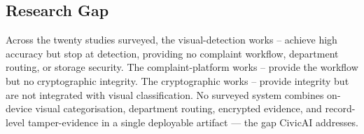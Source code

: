 \documentclass[conference]{IEEEtran}
\begin{document}
\subsection{Research Gap}
Across the twenty studies surveyed, the visual-detection works \cite{l1potyolo}--\cite{l8visualpollution} achieve high accuracy but stop at detection, providing no complaint workflow, department routing, or storage security. The complaint-platform works \cite{l13citysolution}--\cite{l14civicconnect} provide the workflow but no cryptographic integrity. The cryptographic works \cite{l16scchain}--\cite{l20jwteemo} provide integrity but are not integrated with visual classification. No surveyed system combines on-device visual categorisation, department routing, encrypted evidence, and record-level tamper-evidence in a single deployable artifact --- the gap CivicAI addresses.
\end{document}

